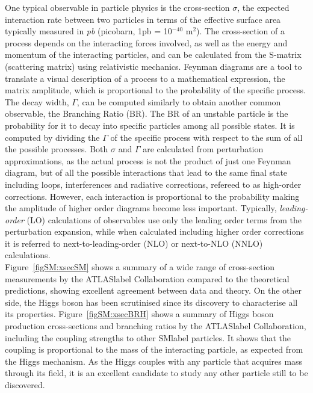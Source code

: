 One typical observable in particle physics is the cross-section $\sigma$, the expected interaction rate between two particles in terms of the effective surface area typically measured in \textit{pb} (picobarn, 1pb = 10$^{-40}$ m$^2$). The cross-section of a process depends on the interacting forces involved, as well as the energy and momentum of the interacting particles, and can be calculated from the S-matrix (scattering matrix) using relativistic mechanics. Feynman diagrams are a tool to translate a visual description of a process to a mathematical expression, the matrix amplitude, which is proportional to the probability of the specific process.\\

The decay width, $\Gamma$, can be computed similarly to obtain another common observable, the Branching Ratio (BR). The BR of an unstable particle is the probability for it to decay into specific particles among all possible states. It is computed by dividing the $\Gamma$ of the specific process with respect to the sum of all the possible processes. Both $\sigma$ and $\Gamma$ are calculated from perturbation approximations, as the actual process is not the product of just one Feynman diagram, but of all the possible interactions that lead to the same final state including loops, interferences and radiative corrections, refereed to as high-order corrections. However, each interaction is proportional to the probability making the amplitude of higher order diagrams become less important. Typically, \textit{leading-order} (LO) calculations of observables use only the leading order terms from the perturbation expansion, while when calculated including higher order corrections it is referred to next-to-leading-order (NLO) or next-to-NLO (NNLO) calculations.\\

Figure~\ref{figSM:xsecSM} shows a summary of a wide range of cross-section measurements by the \acrshort{ATLASlabel} Collaboration compared to the theoretical predictions, showing excellent agreement between data and theory. On the other side, the Higgs boson has been scrutinised since its discovery to characterise all its properties. Figure~\ref{figSM:xsecBRH} shows a summary of Higgs boson production cross-sections and branching ratios by the \acrshort{ATLASlabel} Collaboration, including the coupling strengths to other \acrshort{SMlabel} particles. It shows that the coupling is proportional to the mass of the interacting particle, as expected from the Higgs mechanism. As the Higgs couples with any particle that acquires mass through its field, it is an excellent candidate to study any other particle still to be discovered.\\


